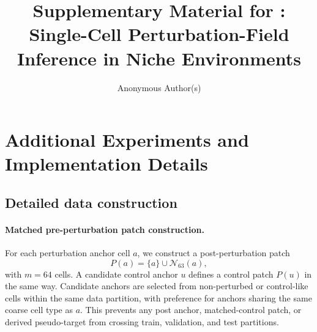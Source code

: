 \documentclass[sigconf,anonymous,review]{acmart}
\title{Supplementary Material for \methodname{}: Single-Cell Perturbation-Field Inference in Niche Environments}
\author{Anonymous Author(s)}
\affiliation{%
  \institution{Anonymous Institution}
  \city{Anonymous}
  \country{Anonymous}
}
\begin{document}
\maketitle

\appendix

\setcounter{table}{0}
\setcounter{figure}{0}
\renewcommand{\thetable}{S\arabic{table}}
\renewcommand{\thefigure}{S\arabic{figure}}
\renewcommand{\theHtable}{appendix.table.\arabic{table}}
\renewcommand{\theHfigure}{appendix.figure.\arabic{figure}}

\section{Additional Experiments and Implementation Details}
\label{app:additional_experiments}

\subsection{Detailed data construction}
\label{app:detailed_data_construction}

\paragraph{Matched pre-perturbation patch construction.}
For each perturbation anchor cell $a$, we construct a post-perturbation patch
\[
P(a)=\{a\}\cup\mathcal N_{63}(a),
\]
with $m=64$ cells. A candidate control anchor $u$ defines a control patch $P(u)$ in the same way. Candidate anchors are selected from non-perturbed or control-like cells within the same data partition, with preference for anchors sharing the same coarse cell type as $a$. This prevents any post anchor, matched-control patch, or derived pseudo-target from crossing train, validation, and test partitions.
\end{document}
